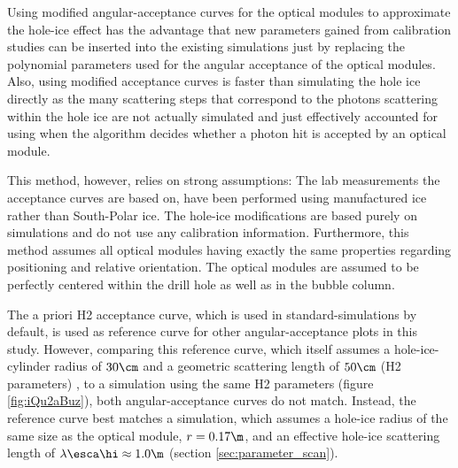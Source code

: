 Using modified angular-acceptance curves for the optical modules to approximate the hole-ice effect has the advantage that new parameters gained from calibration studies can be inserted into the existing simulations just by replacing the polynomial parameters used for the angular acceptance of the optical modules.
Also, using modified acceptance curves is faster than simulating the hole ice directly as the many scattering steps that correspond to the photons scattering within the hole ice are not actually simulated and just effectively accounted for using when the algorithm decides whether a photon hit is accepted by an optical module.

This method, however, relies on strong assumptions: The lab measurements the acceptance curves are based on, have been performed using manufactured ice rather than South-Polar ice. The hole-ice modifications are based purely on simulations and do not use any \icecube calibration information. \cite{icepaper}
Furthermore, this method assumes all optical modules having exactly the same properties regarding positioning and relative orientation. The optical modules are assumed to be perfectly centered within the drill hole as well as in the bubble column.

The a priori H2 acceptance curve, which is used in standard-\clsim simulations by default, is used as reference curve for other angular-acceptance plots in this study.
However, comparing this reference curve, which itself assumes a hole-ice-cylinder radius of $30\cm$ and a geometric scattering length of $50\cm$ (H2 parameters) \cite{icemodelsdata}, to a \clsim simulation using the same H2 parameters (figure \ref{fig:iQu2aBuz}), both angular-acceptance curves do not match. Instead, the reference curve best matches a \clsim simulation, which assumes a hole-ice radius of the same size as the optical module, $r = 0.17\m$, and an effective hole-ice scattering length of $\lambda\esca\hi \approx 1.0\m$ (section \ref{sec:parameter_scan}).

